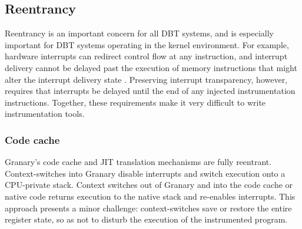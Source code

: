 \documentclass[preprint]{sigplanconf}
\begin{document}

\subsection{Reentrancy}
Reentrancy is an important concern for all DBT systems, and is especially important for DBT systems operating in the kernel environment. For example, hardware interrupts can redirect control flow at any instruction, and interrupt delivery cannot be delayed past the execution of memory instructions that might alter the interrupt delivery state \cite{DRK}. Preserving interrupt transparency, however, requires that interrupts be delayed until the end of any injected instrumentation instructions.  Together, these requirements make it very difficult to write instrumentation tools.

\subsubsection{Code cache}
Granary's code cache and JIT translation mechanisms are fully reentrant. Context-switches into Granary disable interrupts and switch execution onto a CPU-private stack. Context switches out of Granary and into the code cache or native code returns execution to the native stack and re-enables interrupts. This approach presents a minor challenge: context-switches save or restore the entire register state, so as not to disturb the execution of the instrumented program. 

\end{document}
